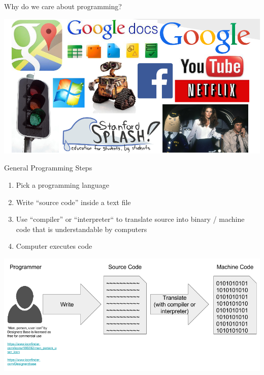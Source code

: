\begin{frame}{Why do we care about programming?}
  \begin{center}
    \includegraphics[scale=.30]{logos.png}
  \end{center}
\end{frame}

\begin{frame}{General Programming Steps}
\begin{enumerate}
\item Pick a programming language
\item Write ``source code'' inside a text file
\item Use ``compiler'' or ``interpreter`` to translate source into binary / machine code that is understandable by computers
\item Computer executes code
\end{enumerate}
\begin{center}
\includegraphics[scale=.34]{human-source-machine.png}
\end{center}
\end{frame}

